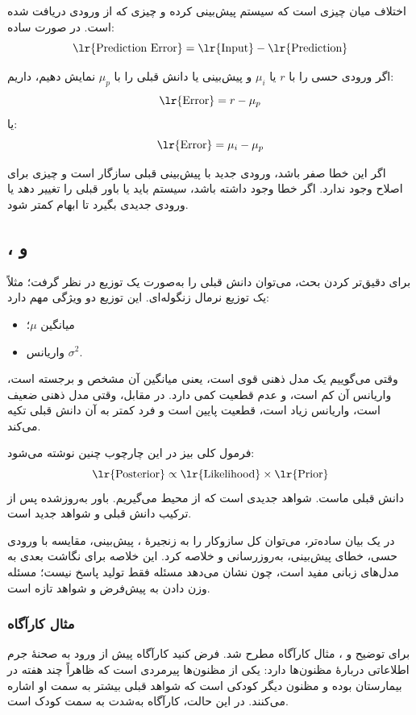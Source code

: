 \subsection{}
 اختلاف میان چیزی است که سیستم پیش‌بینی کرده و چیزی که از ورودی دریافت شده است. در صورت ساده:
\[
\text{\lr{Prediction Error}}=\text{\lr{Input}}-\text{\lr{Prediction}}
\]

اگر ورودی حسی را با \(r\) یا \(\mu_i\) و پیش‌بینی یا دانش قبلی را با \(\mu_p\) نمایش دهیم، داریم:
\[
\text{\lr{Error}}=r-\mu_p
\]
یا:
\[
\text{\lr{Error}}=\mu_i-\mu_p
\]

اگر این خطا صفر باشد، ورودی جدید با پیش‌بینی قبلی سازگار است و چیزی برای اصلاح وجود ندارد. اگر خطا وجود داشته باشد، سیستم باید یا باور قبلی را تغییر دهد یا ورودی جدیدی بگیرد تا ابهام کمتر شود.

\subsection{،  و }
برای دقیق‌تر کردن بحث، می‌توان دانش قبلی را به‌صورت یک توزیع در نظر گرفت؛ مثلاً یک توزیع نرمال زنگوله‌ای. این توزیع دو ویژگی مهم دارد:
\begin{itemize}
  \item میانگین \(\mu\)؛
  \item واریانس \(\sigma^2\).
\end{itemize}

وقتی می‌گوییم یک مدل ذهنی قوی است، یعنی میانگین آن مشخص و برجسته است، واریانس آن کم است، و عدم قطعیت کمی دارد. در مقابل، وقتی مدل ذهنی ضعیف است، واریانس زیاد است، قطعیت پایین است و فرد کمتر به آن دانش قبلی تکیه می‌کند.

فرمول کلی بیز در این چارچوب چنین نوشته می‌شود:
\[
\text{\lr{Posterior}} \propto \text{\lr{Likelihood}} \times \text{\lr{Prior}}
\]
 دانش قبلی ماست.  شواهد جدیدی است که از محیط می‌گیریم.  باور به‌روزشده پس از ترکیب دانش قبلی و شواهد جدید است.

در یک بیان ساده‌تر، می‌توان کل سازوکار را به زنجیرهٔ ، پیش‌بینی، مقایسه با ورودی حسی، خطای پیش‌بینی، به‌روزرسانی و  خلاصه کرد. این خلاصه برای نگاشت بعدی به مدل‌های زبانی مفید است، چون نشان می‌دهد مسئله فقط تولید پاسخ نیست؛ مسئله وزن دادن به پیش‌فرض و شواهد تازه است.

\subsubsection{مثال کارآگاه}
برای توضیح  و ، مثال کارآگاه مطرح شد. فرض کنید کارآگاه پیش از ورود به صحنهٔ جرم اطلاعاتی دربارهٔ مظنون‌ها دارد: یکی از مظنون‌ها پیرمردی است که ظاهراً چند هفته در بیمارستان بوده و مظنون دیگر کودکی است که شواهد قبلی بیشتر به سمت او اشاره می‌کنند. در این حالت،  کارآگاه به‌شدت به سمت کودک است.

